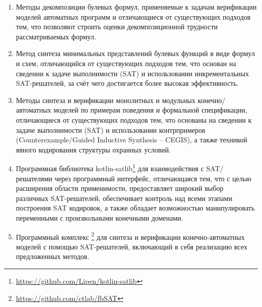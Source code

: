 %
\begin{enumerate}[beginpenalty=10000]
    \item Методы декомпозиции булевых формул, применяемые к задачам верификации моделей автоматных программ и отличающиеся от существующих подходов тем, что позволяют строить оценки декомпозиционной трудности рассматриваемых формул.

    \item Метод синтеза минимальных представлений булевых функций в виде формул и схем, отличающийся от существующих подходов тем, что основан на сведении к задаче выполнимости (SAT) и использовании инкрементальных SAT-решателей, за счёт чего достигается более высокая эффективность.

    \item Методы синтеза и верификации монолитных и модульных конечно\-/автоматных моделей по примерам поведения и формальной спецификации, отличающиеся от существующих подходов тем, что основаны на сведении к задаче выполнимости (SAT) и использовании контрпримеров (Counterexample\-/Guided Inductive Synthesis \--- CEGIS), а также техникой явного кодирования структуры охранных условий.

    \item Программная библиотека kotlin-satlib\footnote{\url{https://github.com/Lipen/kotlin-satlib}} для взаимодействия с SAT\-/решателями через программный интерфейс, отличающаяся тем, что с целью расширения области применимости, предоставляет широкий выбор различных SAT-решателей, обеспечивает контроль над всеми этапами построения SAT кодировок, а также обладает возможностью манипулировать переменными с произвольными конечными доменами.

    \item Программный комплекс \footnote{\url{https://github.com/ctlab/fbSAT}} для синтеза и верификации конечно-автоматных моделей с помощью SAT-решателей, включающий в себя реализацию всех предложенных методов.
\end{enumerate}



